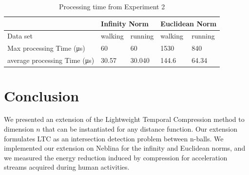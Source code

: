 \documentclass[10pt, conference, compsocconf]{IEEEtran}
\begin{document}
\begin{table}[]
    \begin{tabular}{l|l|l|l|l}
    \hline
    \rowcolor{headcolor}
                                 & \multicolumn{2}{l}{Infinity Norm} & \multicolumn{2}{l}{Euclidean Norm} \\\hline
    Data set                     & walking         & running         & walking          & running \\
    Max processing Time (μs)     & 60              & 60              & 1530             & 840     \\
    average processing Time (μs) & 30.57           & 30.040          & 144.6            & 64.34   \\       
    \hline
    \end{tabular}
    \caption{Processing time from Experiment 2}
    \label{table:result-latency}
\end{table}




\section{Conclusion}

We presented an extension of the Lightweight Temporal Compression 
method to dimension $n$ that can be instantiated for any distance 
function. Our extension formulates LTC as an intersection detection 
problem between n-balls. We implemented our extension on Neblina for the 
infinity and Euclidean norms, and we measured the energy reduction 
induced by compression for acceleration streams acquired during
 human activities.
\end{document}
